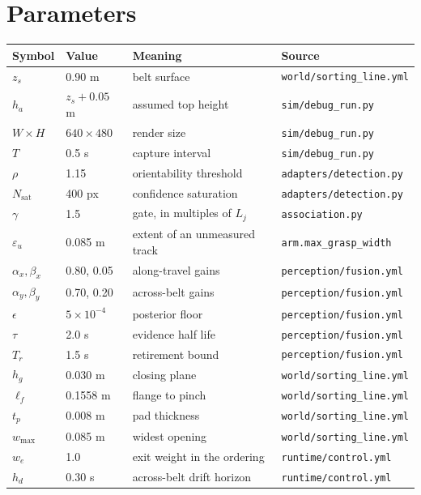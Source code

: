 \documentclass[11pt,a4paper]{article}
\theoremstyle{definition}
\theoremstyle{remark}
\newcommand{\code}[1]{\texttt{#1}}
\begin{document}
\appendix
\section{Parameters}
\label{app:parameters}

\begin{center}
\small
\begin{tabular}{@{}llll@{}}
\toprule
Symbol & Value & Meaning & Source \\
\midrule
$z_s$ & 0.90 m & belt surface & \code{world/sorting\_line.yml} \\
$h_a$ & $z_s + 0.05$ m & assumed top height & \code{sim/debug\_run.py} \\
$W\times H$ & $640\times480$ & render size & \code{sim/debug\_run.py} \\
$T$ & 0.5 s & capture interval & \code{sim/debug\_run.py} \\
$\rho$ & 1.15 & orientability threshold & \code{adapters/detection.py} \\
$N_{\text{sat}}$ & 400 px & confidence saturation & \code{adapters/detection.py} \\
$\gamma$ & 1.5 & gate, in multiples of $L_j$ & \code{association.py} \\
$\varepsilon_u$ & 0.085 m & extent of an unmeasured track & \code{arm.max\_grasp\_width} \\
$\alpha_x, \beta_x$ & 0.80, 0.05 & along-travel gains & \code{perception/fusion.yml} \\
$\alpha_y, \beta_y$ & 0.70, 0.20 & across-belt gains & \code{perception/fusion.yml} \\
$\epsilon$ & $5\times10^{-4}$ & posterior floor & \code{perception/fusion.yml} \\
$\tau$ & 2.0 s & evidence half life & \code{perception/fusion.yml} \\
$T_r$ & 1.5 s & retirement bound & \code{perception/fusion.yml} \\
$h_g$ & 0.030 m & closing plane & \code{world/sorting\_line.yml} \\
$\ell_f$ & 0.1558 m & flange to pinch & \code{world/sorting\_line.yml} \\
$t_p$ & 0.008 m & pad thickness & \code{world/sorting\_line.yml} \\
$w_{\max}$ & 0.085 m & widest opening & \code{world/sorting\_line.yml} \\
$w_e$ & 1.0 & exit weight in the ordering & \code{runtime/control.yml} \\
$h_d$ & 0.30 s & across-belt drift horizon & \code{runtime/control.yml} \\
\bottomrule
\end{tabular}
\end{center}
\end{document}
